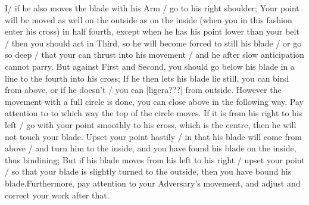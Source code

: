 I/ if he also moves the blade with his Arm / go to his right shoulder;
Your point will be moved as well on the outside as on the inside (when
you in this fashion enter his cross) in  half fourth, except when he
has his point lower than your belt / then you should act in Third, so
he will become forced to still his blade / or go so deep / that your
can thrust into his movement / and he after slow anticipation cannot parry.
But against First and Second, you should go below his blade in a line
to the fourth into his cross; If he then lets his blade lie still, you
can bind from above, or if he doesn't / you can [ligera???] from
outside. However the movement with a full circle is done, you can
close above in the following way. 
Pay attention to to which way the top of the circle moves. If it is
from his right to his left / go with your point smoothly to his cross,
which is the centre, then he will not touch your blade. Upset your
point hastily / in that his blade will come from above / and turn him
to the inside, and you have found his blade on the inside, thus
bindining; But if his blade moves from his left to his right / upset
your point / so that your blade is slightly turned to the outside,
then you have bound his blade.Furthermore, pay attention to your
Adversary's movement, and adjust and correct your work after that.

